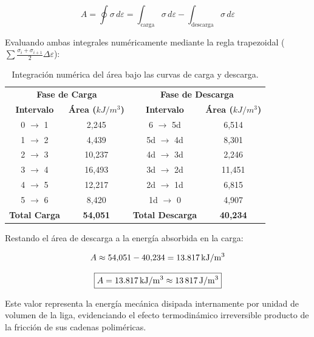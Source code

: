 \begin{equation}
    A = \oint \sigma \, d\varepsilon 
      = \int_{\text{carga}} \sigma \, d\varepsilon 
      - \int_{\text{descarga}} \sigma \, d\varepsilon
    \label{eq:area_histeresis}
\end{equation}

Evaluando ambas integrales numéricamente mediante la regla trapezoidal
($\sum \frac{\sigma_i + \sigma_{i+1}}{2} \Delta\varepsilon$):

\begin{table}[H]
    \centering
    \caption{Integración numérica del área bajo las curvas de carga y descarga.}
    \label{tab:area_histeresis}
    \begin{tabular}{cc|cc}
        \toprule
        \multicolumn{2}{c|}{\textbf{Fase de Carga}} & \multicolumn{2}{c}{\textbf{Fase de Descarga}} \\
        \textbf{Intervalo} & \textbf{Área ($kJ/m^3$)} & \textbf{Intervalo} & \textbf{Área ($kJ/m^3$)} \\
        \midrule
        0 $\to$ 1 &  2{,}245 & 6 $\to$ 5d &  6{,}514 \\
        1 $\to$ 2 &  4{,}439 & 5d $\to$ 4d &  8{,}301 \\
        2 $\to$ 3 & 10{,}237 & 4d $\to$ 3d &  2{,}246 \\
        3 $\to$ 4 & 16{,}493 & 3d $\to$ 2d & 11{,}451 \\
        4 $\to$ 5 & 12{,}217 & 2d $\to$ 1d &  6{,}815 \\
        5 $\to$ 6 &  8{,}420 & 1d $\to$ 0 &  4{,}907 \\
        \midrule
        \textbf{Total Carga} & \textbf{54{,}051} & \textbf{Total Descarga} & \textbf{40{,}234} \\
        \bottomrule
    \end{tabular}
\end{table}

Restando el área de descarga a la energía absorbida en la carga:

\begin{equation*}
    A \approx 54{,}051 - 40{,}234 = \qty{13{,}817}{kJ/m^3}
\end{equation*}

\begin{equation}
    \boxed{A = \qty{13{,}817}{kJ/m^3} \approx \qty{13817}{J/m^3}}
    \label{eq:resultado_area}
\end{equation}

Este valor representa la energía mecánica disipada internamente por
unidad de volumen de la liga, evidenciando el efecto termodinámico 
irreversible producto de la fricción de sus cadenas poliméricas.